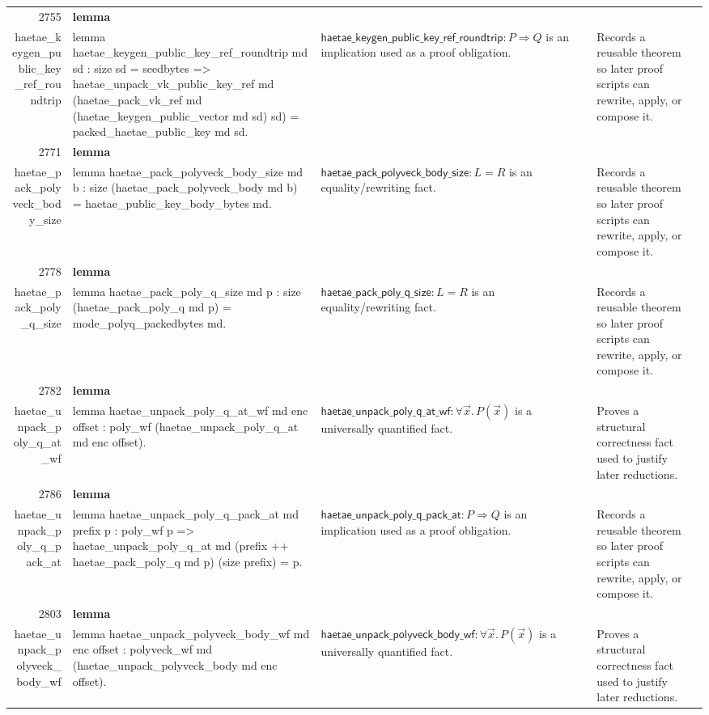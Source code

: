 \documentclass[10pt]{article}
\newcommand{\ec}[1]{\begingroup\ttfamily\scriptsize #1\endgroup}
\begin{document}
\begin{longtable}{r L{0.17\textwidth} L{0.26\textwidth} L{0.27\textwidth} L{0.20\textwidth}}
2755 & \textbf{lemma}\\\ec{haetae\_keygen\_public\_key\_ref\_roundtrip} & \ec{lemma haetae\_keygen\_public\_key\_ref\_roundtrip md sd : size sd = seedbytes => haetae\_unpack\_vk\_public\_key\_ref md (haetae\_pack\_vk\_ref md (haetae\_keygen\_public\_vector md sd) sd) = packed\_haetae\_public\_key md sd.} & \(\mathsf{haetae\_keygen\_public\_key\_ref\_roundtrip} : P \Rightarrow Q\) is an implication used as a proof obligation. & Records a reusable theorem so later proof scripts can rewrite, apply, or compose it. \\
2771 & \textbf{lemma}\\\ec{haetae\_pack\_polyveck\_body\_size} & \ec{lemma haetae\_pack\_polyveck\_body\_size md b : size (haetae\_pack\_polyveck\_body md b) = haetae\_public\_key\_body\_bytes md.} & \(\mathsf{haetae\_pack\_polyveck\_body\_size} : L = R\) is an equality/rewriting fact. & Records a reusable theorem so later proof scripts can rewrite, apply, or compose it. \\
2778 & \textbf{lemma}\\\ec{haetae\_pack\_poly\_q\_size} & \ec{lemma haetae\_pack\_poly\_q\_size md p : size (haetae\_pack\_poly\_q md p) = mode\_polyq\_packedbytes md.} & \(\mathsf{haetae\_pack\_poly\_q\_size} : L = R\) is an equality/rewriting fact. & Records a reusable theorem so later proof scripts can rewrite, apply, or compose it. \\
2782 & \textbf{lemma}\\\ec{haetae\_unpack\_poly\_q\_at\_wf} & \ec{lemma haetae\_unpack\_poly\_q\_at\_wf md enc offset : poly\_wf (haetae\_unpack\_poly\_q\_at md enc offset).} & \(\mathsf{haetae\_unpack\_poly\_q\_at\_wf} : \forall \vec{x}.\, P(\vec{x})\) is a universally quantified fact. & Proves a structural correctness fact used to justify later reductions. \\
2786 & \textbf{lemma}\\\ec{haetae\_unpack\_poly\_q\_pack\_at} & \ec{lemma haetae\_unpack\_poly\_q\_pack\_at md prefix p : poly\_wf p => haetae\_unpack\_poly\_q\_at md (prefix ++ haetae\_pack\_poly\_q md p) (size prefix) = p.} & \(\mathsf{haetae\_unpack\_poly\_q\_pack\_at} : P \Rightarrow Q\) is an implication used as a proof obligation. & Records a reusable theorem so later proof scripts can rewrite, apply, or compose it. \\
2803 & \textbf{lemma}\\\ec{haetae\_unpack\_polyveck\_body\_wf} & \ec{lemma haetae\_unpack\_polyveck\_body\_wf md enc offset : polyveck\_wf md (haetae\_unpack\_polyveck\_body md enc offset).} & \(\mathsf{haetae\_unpack\_polyveck\_body\_wf} : \forall \vec{x}.\, P(\vec{x})\) is a universally quantified fact. & Proves a structural correctness fact used to justify later reductions. \\

\end{longtable}
\end{document}
